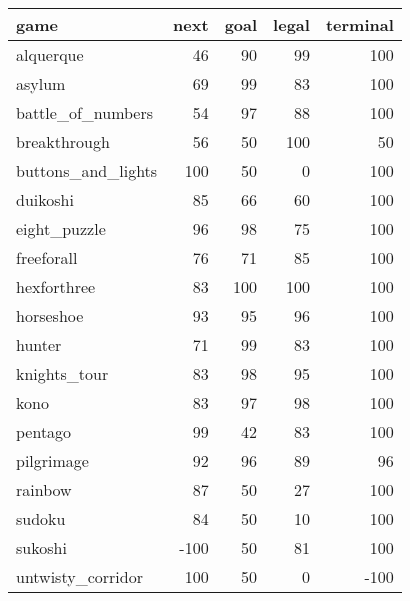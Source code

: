 \documentclass[a4paper,12pt]{report}
\begin{document}
\begin{tabular}{lrrrr}
\hline
 game               &   next &   goal &   legal &   terminal \\
\hline
 alquerque          &     46 &     90 &      99 &        100 \\
 asylum             &     69 &     99 &      83 &        100 \\
 battle\_of\_numbers  &     54 &     97 &      88 &        100 \\
 breakthrough       &     56 &     50 &     100 &         50 \\
 buttons\_and\_lights &    100 &     50 &       0 &        100 \\
 duikoshi           &     85 &     66 &      60 &        100 \\
 eight\_puzzle       &     96 &     98 &      75 &        100 \\
 freeforall         &     76 &     71 &      85 &        100 \\
 hexforthree        &     83 &    100 &     100 &        100 \\
 horseshoe          &     93 &     95 &      96 &        100 \\
 hunter             &     71 &     99 &      83 &        100 \\
 knights\_tour       &     83 &     98 &      95 &        100 \\
 kono               &     83 &     97 &      98 &        100 \\
 pentago            &     99 &     42 &      83 &        100 \\
 pilgrimage         &     92 &     96 &      89 &         96 \\
 rainbow            &     87 &     50 &      27 &        100 \\
 sudoku             &     84 &     50 &      10 &        100 \\
 sukoshi            &   -100 &     50 &      81 &        100 \\
 untwisty\_corridor  &    100 &     50 &       0 &       -100 \\
\hline
\end{tabular}
\end{document}
